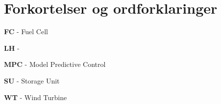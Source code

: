 \chapter*{Forkortelser og ordforklaringer}

\begin{description}


\item \textbf{FC} - Fuel Cell
\item \textbf{LH} - 
\item \textbf{MPC} - Model Predictive Control
\item \textbf{SU} - Storage Unit
\item \textbf{WT} - Wind Turbine

 




\end{description}





